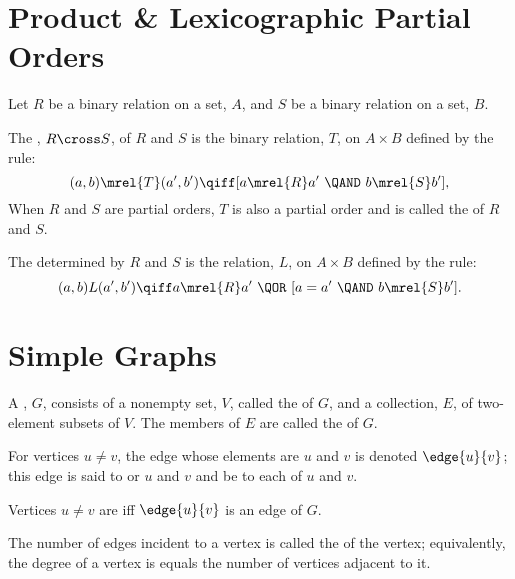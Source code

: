 \documentclass[handout]{mcs}
\begin{document}




\appendix

\section{Product \& Lexicographic Partial Orders}

Let $R$ be a binary relation on a set, $A$, and $S$ be a binary
relation on a set, $B$.


The , $R \cross S$, of $R$ and $S$ is the binary
relation, $T$, on $A \times B$ defined by the rule:
\[
(a,b) \mrel{T} (a',b') \qiff [a \mrel{R} a'\ \QAND\ b \mrel{S} b'],
\]
When $R$ and $S$ are partial orders, $T$ is also a partial order and is
called the  of $R$ and $S$.

The  determined by $R$ and
$S$ is the relation, $L$, on $A \times B$ defined by the rule:
\[
(a,b) L (a',b') \qiff
    a \mrel{R} a'\ \QOR\ [a = a'\ \QAND\ b \mrel{S} b'].
\]


\section{Simple Graphs}

A , $G$, consists of a nonempty set, $V$, called the
 of $G$, and a collection, $E$, of two-element subsets of
$V$.  The members of $E$ are called the  of $G$.

For vertices $u \neq v$, the edge whose elements are $u$ and $v$ is denoted
$\edge{u}{v}$; this edge is said to  or  $u$
and $v$ and be  to each of $u$ and $v$.

Vertices $u \neq v$ are  iff $\edge{u}{v}$ is an edge of
$G$.

The number of edges incident to a vertex is called the  of
the vertex; equivalently, the degree of a vertex is equals the number of
vertices adjacent to it.
\end{document}

